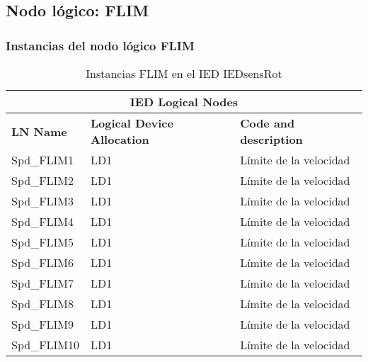 
\subsection{Nodo l\'ogico: 			 FLIM}

    \subsubsection{Instancias del nodo l\'ogico FLIM}
    \begin{table}[H]
    \begin{center}
    \begin{tabular}{|l|l|p{6.8cm}|}
            \hline
            \multicolumn{3}{|c|}{\cellcolor[gray]{0.8} \textbf{IED Logical Nodes} } \\
            \hline
            \textbf{LN Name} & \textbf{Logical Device Allocation} & \textbf{Code and description} \\
            \hline
            Spd\_FLIM1 & LD1 & L\'imite de la velocidad \\
            \hline
            Spd\_FLIM2 & LD1 & L\'imite de la velocidad \\
            \hline
            Spd\_FLIM3 & LD1 & L\'imite de la velocidad \\
            \hline
            Spd\_FLIM4 & LD1 & L\'imite de la velocidad \\
            \hline
            Spd\_FLIM5 & LD1 & L\'imite de la velocidad \\
            \hline
            Spd\_FLIM6 & LD1 & L\'imite de la velocidad \\
            \hline
            Spd\_FLIM7 & LD1 & L\'imite de la velocidad \\
            \hline
            Spd\_FLIM8 & LD1 & L\'imite de la velocidad \\
            \hline
            Spd\_FLIM9 & LD1 & L\'imite de la velocidad \\
            \hline
            Spd\_FLIM10 & LD1 & L\'imite de la velocidad \\
            \hline
    \end{tabular}
    \caption{Instancias FLIM en el IED IEDsensRot}
    \label{table:lnInstFLIM_tipical}
    \end{center}
    \end{table}
    
    
    

